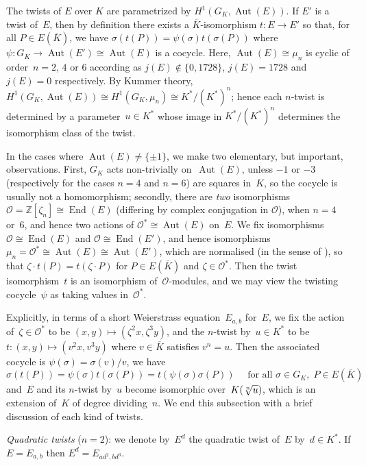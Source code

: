 \documentclass[12pt, reqno]{amsart}
\newcommand{\Z}{\mathbb{Z}}
\newcommand{\Kbar}{{\overline{K}}}
\newcommand{\calO}{\mathcal{O}}
\DeclareMathOperator{\Aut}{Aut}
\DeclareMathOperator{\End}{End}
\numberwithin{equation}{section}
\theoremstyle{definition}
\theoremstyle{remark}
\begin{document}
The twists of $E$ over $K$ are parametrized by $H^1(G_K,\Aut(E))$.  If
$E'$ is a twist of~$E$, then by definition there exists a $\Kbar$-isomorphism
$t:E\to E'$ so that, for all $P\in E(\Kbar)$, we have 
$\sigma(t(P))=\psi(\sigma)t(\sigma(P))$ 
where~$\psi:G_K\to\Aut(E')\cong\Aut(E)$ is a cocycle.  Here,
$\Aut(E)\cong\mu_n$ is cyclic of order~$n=2$, $4$ or $6$ according as
$j(E)\not\in\{0,1728\}$, $j(E)=1728$ and $j(E)=0$ respectively.  By
Kummer theory, $H^1(G_K,\Aut(E))\cong H^1(G_K,\mu_n)\cong
K^*/(K^*)^n$; hence each $n$-twist is determined by a parameter~$u\in
K^*$ whose image in $K^*/(K^*)^n$ determines the isomorphism class of
the twist. 

In the cases where $\Aut(E)\not=\{\pm1\}$, we make two elementary, but
important, observations. First, $G_K$ acts non-trivially on~$\Aut(E)$,
unless $-1$ or $-3$ (respectively for the cases $n=4$ and $n=6$) are
squares in~$K$, so the cocycle is usually not a homomorphism;
secondly, there are \emph{two} isomorphisms
$\calO=\Z[\zeta_n]\cong\End(E)$ (differing by complex conjugation in
$\calO$), when $n=4$ or~$6$, and hence two actions of
$\calO^*\cong\Aut(E)$ on~$E$.  We fix isomorphisms $\calO\cong\End(E)$
and $\calO\cong\End(E')$, and hence isomorphisms
$\mu_n=\calO^*\cong\Aut(E)\cong\Aut(E')$, which are normalised (in the
sense of \cite[Prop.~I.1.1]{SilvermanII}), so that $\zeta\cdot
t(P)=t(\zeta\cdot P)$ for $P\in E(\Kbar)$ and $\zeta\in\calO^*$. Then
the twist isomorphism~$t$ is an isomorphism of~$\calO$-modules, and we
may view the twisting cocycle~$\psi$ as taking values in~$\calO^*$.

Explicitly, in terms of a short Weierstrass equation~$E_{a,b}$ for~$E$, we fix
the action of~$\zeta\in\calO^*$ to be
$(x,y)\mapsto(\zeta^2x,\zeta^3y)$, and the $n$-twist by~$u\in K^*$ to be
$t:(x,y)\mapsto(v^2x,v^3y)$ where $v \in \overline{K}$ satisfies $v^n=u$. Then the associated cocycle is
$\psi(\sigma)=\sigma(v)/v$, we have
\begin{equation}\label{E:twist}
  \sigma(t(P)) = \psi(\sigma)t(\sigma(P)) = t(\psi(\sigma)\sigma(P))
   \quad \text{ for all } \sigma \in G_K,
  \; P \in E(\Kbar)
\end{equation}
and~$E$ and its $n$-twist by~$u$ become isomorphic
over~$K(\root n\of u)$, which is an extension of~$K$ of degree
dividing~$n$.
We end this subsection with a brief discussion of each kind of twists.

\emph{Quadratic twists} ($n=2$): we denote by~$E^d$ the quadratic
twist of~$E$ by~$d\in K^*$.  If $E=E_{a,b}$ then $E^d=E_{ad^2,bd^3}$.
\end{document}
